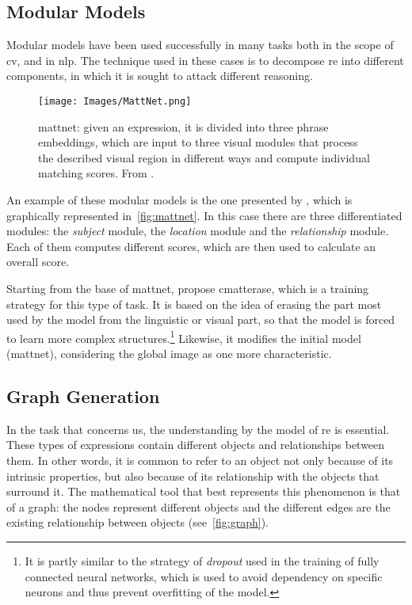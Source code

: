 \subsection{Modular Models}\label{sec:modular}
Modular models have been used successfully in many tasks both in the scope of
\gls{cv}, and in \gls{nlp}. The technique used in these cases is to decompose
\gls{re} into different components, in which it is sought to attack different
reasoning.

\begin{figure}[ht]
  \centering
  \texttt{[image: Images/MattNet.png]}
  \caption[]{\gls{mattnet}: given an expression, it is
    divided into three phrase embeddings, which are input to three visual
    modules that process the described visual region in different ways and
    compute individual matching scores. From .}%
  \label{fig:mattnet}
\end{figure}

An example of these modular models is the one presented by ,
which is graphically represented in\ \vref{fig:mattnet}. In this case there are
three differentiated modules: the \emph{subject} module, the \emph{location}
module and the \emph{relationship} module. Each of them computes different
scores, which are then used to calculate an overall score.

Starting from the base of \gls{mattnet},
 propose
\gls{cmatterase}, which is a training strategy for this type of task. It is
based on the idea of erasing the part most used by the model from the
linguistic or visual part, so that the model is forced to learn more complex
structures.\footnote{It is partly similar to the strategy of \emph{dropout}
  used in the training of fully connected neural networks, which is used to
  avoid dependency on specific neurons and thus prevent overfitting of the
  model.} Likewise, it modifies the initial model (\gls{mattnet}), considering
the global image as one more characteristic.


\subsection{Graph Generation}\label{sec:graph}
In the task that concerns us, the understanding by the model of \gls{re} is
essential. These types of expressions contain different objects and
relationships between them. In other words, it is common to refer to an object
not only because of its intrinsic properties, but also because of its
relationship with the objects that surround it. The mathematical tool that best
represents this phenomenon is that of a graph: the nodes represent different
objects and the different edges are the existing relationship between objects
(see\ \vref{fig:graph}).

